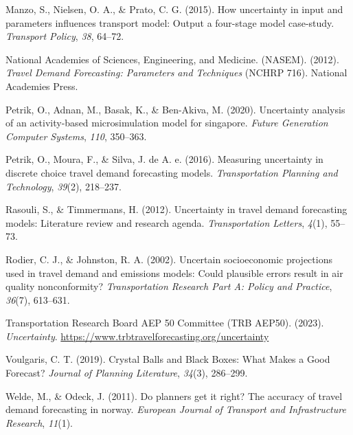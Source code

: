 \documentclass[fancy, masters, twoside]{byuthesis}
\newlength{\cslhangindent}
\newlength{\cslentryspacingunit} %
\newenvironment{CSLReferences}[2] %
 {%
  \setlength{\parindent}{0pt}
  \ifodd #1
  \let\oldpar\par
  \def\par{\hangindent=\cslhangindent\oldpar}
  \fi
  \setlength{\parskip}{#2\cslentryspacingunit}
 }%
 {}
\begin{document}
\begin{CSLReferences}{1}{0}
\leavevmode{}%
Manzo, S., Nielsen, O. A., \& Prato, C. G. (2015). How uncertainty in input and parameters influences transport model: Output a four-stage model case-study. \emph{Transport Policy}, \emph{38}, 64--72.

\leavevmode{}%
National Academies of Sciences, Engineering, and Medicine. (NASEM). (2012). \emph{Travel {Demand Forecasting}: {Parameters} and {Techniques}} (NCHRP 716). {National Academies Press}.

\leavevmode{}%
Petrik, O., Adnan, M., Basak, K., \& Ben-Akiva, M. (2020). Uncertainty analysis of an activity-based microsimulation model for singapore. \emph{Future Generation Computer Systems}, \emph{110}, 350--363.

\leavevmode{}%
Petrik, O., Moura, F., \& Silva, J. de A. e. (2016). Measuring uncertainty in discrete choice travel demand forecasting models. \emph{Transportation Planning and Technology}, \emph{39}(2), 218--237.

\leavevmode{}%
Rasouli, S., \& Timmermans, H. (2012). Uncertainty in travel demand forecasting models: Literature review and research agenda. \emph{Transportation Letters}, \emph{4}(1), 55--73.

\leavevmode{}%
Rodier, C. J., \& Johnston, R. A. (2002). Uncertain socioeconomic projections used in travel demand and emissions models: Could plausible errors result in air quality nonconformity? \emph{Transportation Research Part A: Policy and Practice}, \emph{36}(7), 613--631.

\leavevmode{}%
Transportation Research Board AEP 50 Committee (TRB AEP50). (2023). \emph{Uncertainty}. \url{https://www.trbtravelforecasting.org/uncertainty}

\leavevmode{}%
Voulgaris, C. T. (2019). Crystal {Balls} and {Black Boxes}: {What Makes} a {Good Forecast}? \emph{Journal of Planning Literature}, \emph{34}(3), 286--299.

\leavevmode{}%
Welde, M., \& Odeck, J. (2011). Do planners get it right? The accuracy of travel demand forecasting in norway. \emph{European Journal of Transport and Infrastructure Research}, \emph{11}(1).


\end{CSLReferences}
\end{document}
